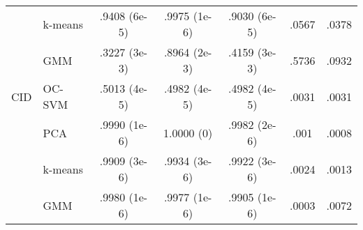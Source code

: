 \documentclass[10pt,a4paper,conference]{IEEEtran}
\begin{document}
\begin{table*}[t!]
\begin{threeparttable}
\begin{tabular}{llccccc}
\ & k-means & .9408  (6e-5) & .9975 (1e-6) & .9030 (6e-5) & .0567 & .0378  \\ 
\ & GMM & .3227 (3e-3) & .8964 (2e-3) & .4159 (3e-3) & .5736 & .0932 \\ \hline 
CID & OC-SVM & .5013 (4e-5) & .4982 (4e-5) & .4982 (4e-5) & .0031 & .0031  \\ 
\ & PCA & .9990 (1e-6) & 1.0000 (0) & .9982 (2e-6) & .001 & .0008  \\ 
\ & k-means & .9909 (3e-6) & .9934 (3e-6) & .9922 (3e-6) & .0024 & .0013  \\ 
\ & GMM & .9980 (1e-6) & .9977 (1e-6) & .9905 (1e-6) & .0003 & .0072 \\ \hline 
\end{tabular}
\end{threeparttable}
\label{tab1:auc}
\end{table*}







\end{document}
